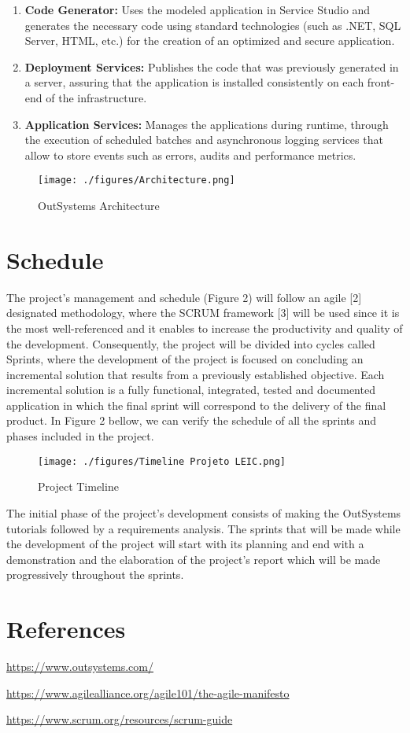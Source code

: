 \documentclass[a4paper,openright,12pt]{report}
\begin{document}
\begin{enumerate}
\item \textbf{Code Generator:} Uses the modeled application in Service Studio and generates the necessary code using standard technologies (such as .NET, SQL Server, HTML, etc.) for the creation of an optimized and secure application.
\item \textbf{ Deployment Services:} Publishes the code that was previously generated in a server, assuring that the application is installed consistently on each front-end of the infrastructure.
\item  \textbf{Application Services:} Manages the applications during runtime, through the execution of scheduled batches and asynchronous logging services that allow to store events such as errors, audits and performance metrics.
\end{enumerate}

\begin{figure}[H]
  \texttt{[image: ./figures/Architecture.png]}
  \caption{OutSystems Architecture}\label{fig:architecture}
\end{figure}

\section*{Schedule} 

The project's management and schedule (Figure 2) will follow an agile [2] designated methodology, 
where the SCRUM framework [3] will be used since it is the most well-referenced and it enables to 
increase the productivity and quality of the development. 
Consequently, the project will be divided into cycles called Sprints, 
where the development of the project is focused on concluding an incremental solution that results 
from a previously established objective. Each incremental solution  is a fully functional, integrated, 
tested and documented application in which the final sprint will correspond to the delivery of the final product. 
In Figure 2 bellow, we can verify the schedule of all the sprints and phases included in the project.

\begin{figure}[H]
  \texttt{[image: ./figures/Timeline Projeto LEIC.png]}
  \caption{Project Timeline}\label{fig:schedule}
\end{figure}

The initial phase of the project's development consists of making the OutSystems tutorials followed by a requirements analysis. 
The sprints that will be made while the development of the project will start with its planning and end with a demonstration 
and the elaboration of the project's report which will be made progressively throughout the sprints.

\section*{References}
\begin{enumerate}[label={[\arabic*]}]
  \item \url{https://www.outsystems.com/}
  \item \url{https://www.agilealliance.org/agile101/the-agile-manifesto}
  \item \url{https://www.scrum.org/resources/scrum-guide}
\end{enumerate}
\end{document}
